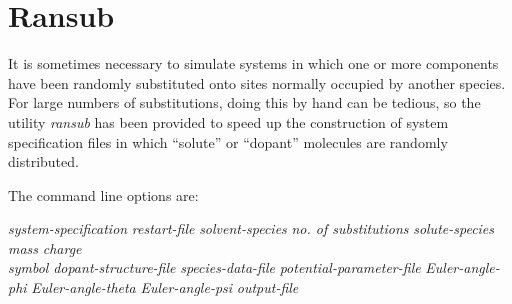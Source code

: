 \documentclass[a4paper,twoside]{report}
\begin{document}
\section{Ransub}%
\label{sec:ransub}
It is sometimes necessary to simulate systems in which one or
more components have been randomly substituted onto sites
normally occupied by another species. For large numbers of substitutions,
doing this by hand can be tedious, so the utility \emph{ransub} has been
provided to speed up the construction of system specification files in which
``solute'' or ``dopant'' molecules are randomly distributed.
        
The command line options are:
\begin{center}
\Lit{[-s} \textit{system-specification} \Lit{|}
 \textit{restart-file}\Lit{]}
\Lit{[-m} \textit{solvent-species}\Lit{]} 
\Lit{[-n} \textit{no. of substitutions}\Lit{]} 
\Lit{[-u} \textit{solute-species}\Lit{]}
\Lit{[-w} \textit{mass}\Lit{]} 
\Lit{[-q} \textit{charge}\Lit{]} \\
\Lit{[-z} \textit{symbol}\Lit{]}
\Lit{[-a} \textit{dopant-structure-file}\Lit{]}
\Lit{[-e} \textit{species-data-file}\Lit{]} 
\Lit{[-y} \textit{potential-parameter-file}\Lit{]} 
\Lit{[-f} \textit{Euler-angle-phi}\Lit{]}
\Lit{[-t} \textit{Euler-angle-theta}\Lit{]} 
\Lit{[-p} \textit{Euler-angle-psi}\Lit{]} 
\Lit{[-x]}
\Lit{[-h]}
\Lit{[-k]}
\Lit{[-j]}
\Lit{[-c]}
\Lit{[-o} \textit{output-file}\Lit{]}
\end{center}
\end{document}
